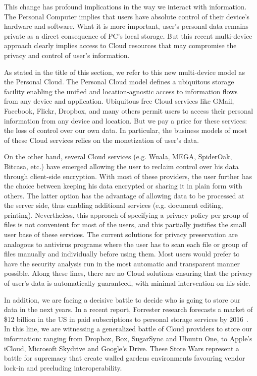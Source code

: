 This change has profound implications in the way we interact with information. The Personal Computer implies that users have absolute control of their device's hardware and software.  What it is more important, user's personal data remains private as a direct consequence of  PC's local storage.  But this recent multi-device approach clearly implies access to Cloud resources that may compromise the privacy and control of user's  information.


As stated in the title of this section, we refer to this new multi-device model as the Personal Cloud. The Personal Cloud model defines a ubiquitous storage facility enabling the unified and location-agnostic access to information flows from any device and application.  Ubiquitous free Cloud services like GMail, Facebook, Flickr, Dropbox, and many others permit users to access their personal information from any device and location.  But we pay a price for these services: the loss of control over our own data. In particular, the business models of most of these Cloud services relies on the monetization of user's data.


On the other hand, several Cloud services (e.g. Wuala, MEGA, SpiderOak, Bitcasa, etc.) have emerged allowing the user to reclaim control over his data through client-side encryption. With most of these providers, the user further has the choice between keeping his data encrypted or sharing it in plain form with others. The latter option has the advantage of allowing data to be processed at the server side, thus enabling additional services (e.g. document editing, printing). Nevertheless, this approach of specifying a privacy policy per group of files is not convenient for most of the users, and this partially justifies the small user base of these services. The current solutions for privacy preservation are analogous to antivirus programs where the user has to scan each file or group of files manually and individually before using them. Most users would prefer to have the security analysis run in the most automatic and transparent manner possible. Along these lines, there are no Cloud solutions ensuring that the privacy of user's data is automatically guaranteed, with minimal intervention on his side.


In addition, we are facing a decisive battle to decide who is going to store our data in the next years.  In a recent report, Forrester research forecasts a market of \$12 billion in the US in paid subscriptions to personal storage services by 2016~\cite{forrester}. In this line, we are witnessing a generalized battle of Cloud providers to store our information: ranging from Dropbox, Box, SugarSync and Ubuntu One, to Apple's iCloud, Microsoft Skydrive and Google's Drive. These Store Wars represent  a battle for supremacy that create walled gardens environments favouring vendor lock-in and precluding interoperability.



